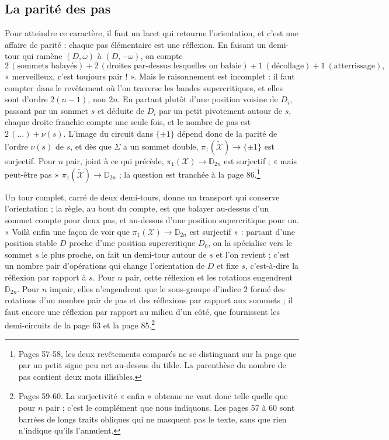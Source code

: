 \documentclass[11pt,a4paper]{article}
\begin{document}
\subsection*{La parité des pas}

Pour atteindre ce caractère, il faut un lacet qui retourne l'orientation, et
c'est une affaire de parité : chaque pas élémentaire est une réflexion. En
faisant un demi-tour qui ramène $(D, \omega)$ à $(D, -\omega)$, on compte
\[
2\,(\text{sommets balayés}) + 2\,(\text{droites par-dessus lesquelles on
balaie}) + 1 \ (\text{décollage}) + 1 \ (\text{atterrissage}),
\]
« merveilleux, c'est toujours pair ! ». Mais le raisonnement est incomplet : il
faut compter dans le revêtement où l'on traverse les bandes supercritiques, et
elles sont d'ordre $2(n-1)$, non $2n$. En partant plutôt d'une position voisine
de $D_i$, passant par un sommet $s$ et déduite de $D_i$ par un petit pivotement
autour de $s$, chaque droite franchie compte une seule fois, et le nombre de pas
est $2\,(\ldots) + \nu(s)$. L'image du circuit dans $\lbrace \pm 1 \rbrace$
dépend donc de la parité de l'ordre $\nu(s)$ de $s$, et dès que $\Sigma$ a un
sommet double, $\pi_1(\widetilde{\mathcal{X}}) \to \lbrace \pm 1 \rbrace$ est
surjectif. Pour $n$ pair, joint à ce qui précède, $\pi_1(\mathcal{X}) \to
\mathbb{D}_{2n}$ est surjectif ; « mais peut-être pas »
$\pi_1(\widetilde{\mathcal{X}}) \to \mathbb{D}_{2n}$ ; la question est tranchée
à la page 86.\footnote{Pages 57-58, les deux revêtements comparés ne se
distinguant sur la page que par un petit signe peu net au-dessus du tilde. La
parenthèse du nombre de pas contient deux mots illisibles.}

Un tour complet, carré de deux demi-tours, donne un transport qui conserve
l'orientation ; la règle, au bout du compte, est que balayer au-dessus d'un
sommet compte pour deux pas, et au-dessus d'une position supercritique pour un.
« Voilà enfin une façon de voir que $\pi_1(\mathcal{X}) \to \mathbb{D}_{2n}$ est
surjectif » : partant d'une position stable $D$ proche d'une position
supercritique $D_0$, on la spécialise vers le sommet $s$ le plus proche, on fait
un demi-tour autour de $s$ et l'on revient ; c'est un nombre pair d'opérations
qui change l'orientation de $D$ et fixe $s$, c'est-à-dire la réflexion par
rapport à $s$. Pour $n$ pair, cette réflexion et les rotations engendrent
$\mathbb{D}_{2n}$. Pour $n$ impair, elles n'engendrent que le sous-groupe
d'indice $2$ formé des rotations d'un nombre pair de pas et des réflexions par
rapport aux sommets ; il faut encore une réflexion par rapport au milieu d'un
côté, que fournissent les demi-circuits de la page 63 et la page
85.\footnote{Pages 59-60. La surjectivité « enfin » obtenue ne vaut donc telle
quelle que pour $n$ pair ; c'est le complément que nous indiquons. Les pages 57
à 60 sont barrées de longs traits obliques qui ne masquent pas le texte, sans
que rien n'indique qu'ils l'annulent.}
\end{document}
